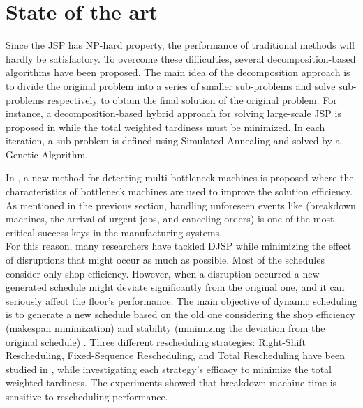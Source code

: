 \documentclass{article}
\begin{document}
\section{State of the art}
Since the JSP has NP-hard property, the performance of traditional methods will hardly be satisfactory. To overcome these difficulties, several decomposition-based algorithms have been proposed. The main idea of the decomposition approach is to divide the original problem into a series of smaller sub-problems and solve sub-problems respectively to obtain the final solution of the original problem. For instance, a decomposition-based hybrid approach for solving large-scale JSP is proposed in \cite{zhang2010hybrid} while the total weighted tardiness must be minimized. In each iteration, a sub-problem is defined using Simulated Annealing and solved by a Genetic Algorithm. 

In \cite{zhai2014decomposition}, a new method for detecting multi-bottleneck machines is proposed where the characteristics of bottleneck machines are used to improve the solution efficiency. As mentioned in the previous section, handling unforeseen events like (breakdown machines, the arrival of urgent jobs, and canceling orders) is one of the most critical success keys in the manufacturing systems. \\

For this reason, many researchers have tackled DJSP while minimizing the effect of disruptions that might occur as much as possible. Most of the schedules consider only shop efficiency. However, when a disruption occurred a new generated schedule might deviate significantly from the original one, and it can seriously affect the floor's performance. The main objective of dynamic scheduling is to generate a new schedule based on the old one considering the shop efficiency (makespan minimization) and stability (minimizing the deviation from the original schedule) \cite{ouelhadj2009survey}. Three different rescheduling strategies: Right-Shift Rescheduling, Fixed-Sequence Rescheduling, and Total Rescheduling have been studied in \cite{mason2004rescheduling}, while investigating each strategy's efficacy to minimize the total weighted tardiness. The experiments showed that breakdown machine time is sensitive to rescheduling performance.\\
\end{document}
